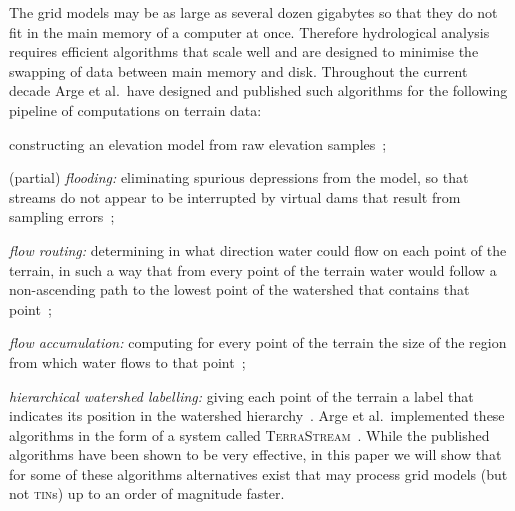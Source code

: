 \documentclass[10pt,a4paper]{article}
\newenvironment{denseitems}{\list{$\bullet$}{\itemsep0pt\parsep0pt}}{\endlist}
\def\tins{\textsc{tin}s\xspace}
\def\tsm{\textsc{TerraStream}\xspace}
\begin{document}
The grid models may be as large as several dozen gigabytes so that they do not fit in the main memory of a computer at once. Therefore hydrological analysis requires efficient algorithms that scale well and are designed to minimise the swapping of data between main memory and disk. Throughout the current decade Arge et al.\ have designed and published such algorithms for the following pipeline of computations on terrain data:\begin{denseitems}
\item constructing an elevation model from raw elevation samples~\cite{cloud,terrastream};
\item (partial) \emph{flooding:} eliminating spurious depressions from the model, so that streams do not appear to be interrupted by virtual dams that result from sampling errors~\cite{unionfind,terraflow,terrastream};
\item \emph{flow routing:} determining in what direction water could flow on each point of the terrain, in such a way that from every point of the terrain water would follow a non-ascending path to the lowest point of the watershed that contains that point~\cite{terraflow,terrastream};
\item \emph{flow accumulation:} computing for every point of the terrain the size of the region from which water flows to that point~\cite{terraflow,gridproblems,terrastream};
\item \emph{hierarchical watershed labelling:} giving each point of the terrain a label that indicates its position in the watershed hierarchy~\cite{pfafstetter,terrastream}.
\end{denseitems}
Arge et al.\ implemented these algorithms in the form of a system called \tsm~\cite{terrastream}.
While the published algorithms have been shown to be very effective, in this paper we will show that for some of these algorithms alternatives exist that may process grid models (but not \tins) up to an order of magnitude faster.
\end{document}
